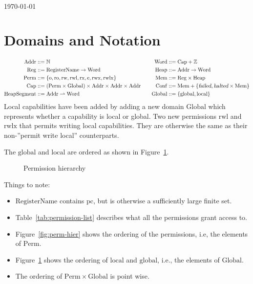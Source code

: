 \documentclass{article}
\newcommand{\parfun}{\rightharpoonup}
\newcommand{\pcreg}{\mathrm{pc}}
\newcommand{\failed}{\textsl{failed}}
\newcommand{\halted}{\textsl{halted}}
\newcommand{\plaindom}[1]{\mathrm{#1}}
\newcommand{\Caps}{\plaindom{Cap}}
\newcommand{\Words}{\plaindom{Word}}
\newcommand{\Addrs}{\plaindom{Addr}}
\newcommand{\Mems}{\plaindom{Mem}}
\newcommand{\RegName}{\plaindom{RegisterName}}
\newcommand{\Regs}{\plaindom{Reg}}
\newcommand{\Heaps}{\plaindom{Heap}}
\newcommand{\HeapSegments}{\plaindom{HeapSegment}}
\newcommand{\Confs}{\plaindom{Conf}}
\newcommand{\nats}{\mathbb{N}}
\newcommand{\ints}{\mathbb{Z}}
\newcommand{\Perms}{\plaindom{Perm}}
\newcommand{\Globals}{\plaindom{Global}}
\newcommand{\plainperm}[1]{\mathrm{#1}}
\newcommand{\noperm}{\plainperm{o}}
\newcommand{\readonly}{\plainperm{ro}}
\newcommand{\readwrite}{\plainperm{rw}}
\newcommand{\exec}{\plainperm{rx}}
\newcommand{\entry}{\plainperm{e}}
\newcommand{\rwx}{\plainperm{rwx}}
\newcommand{\readwritel}{\plainperm{rwl}}
\newcommand{\rwlx}{\plainperm{rwlx}}
\newcommand{\local}{\plainperm{local}}
\newcommand{\glob}{\plainperm{global}}
\begin{document}
\begin{flushright}
\today
\end{flushright}
\section{Domains and Notation}
\begin{align*}
\Addrs &::= \nats & & &
\Words &::= \Caps + \ints \\
\Regs  &::= \RegName \rightarrow \Words & & &
\Heaps &::= \Addrs \rightarrow \Words \\
\Perms &::= \{ \noperm, \readonly, \readwrite, \readwritel, \exec, \entry, \rwx, \rwlx\} & & &
\Mems  &::= \Regs \times \Heaps \\
\Caps  &::= (\Perms \times \Globals) \times \Addrs \times \Addrs \times \Addrs & & &
\Confs &::= \Mems + \{\failed, \halted \times \Mems\} \\
\HeapSegments &::= \Addrs \parfun \Words & & &
\Globals & ::= \{\glob, \local \}
\end{align*}
Local capabilities have been added by adding a new domain $\Globals$ which represents whether a capability is local or global. Two new permissions $\readwritel$ and $\rwlx$ that permits writing local capabilities. They are otherwise the same as their non-''permit write local'' counterparts.

The $\glob$ and $\local$ are ordered as shown in Figure~\ref{fig:glob-hier}.
\begin{figure}[!h]
  \centering
\caption{Permission hierarchy}
\label{fig:glob-hier}
\end{figure}

Things to note:
\begin{itemize}
\item $\RegName$ contains $\pcreg$, but is otherwise a sufficiently
  large finite set.
\item Table~\ref{tab:permission-list} describes what all the permissions grant access to.
\item Figure~\ref{fig:perm-hier} shows the ordering of the permissions, i.e, the elements of $\Perms$.
\item Figure~\ref{fig:glob-hier} shows the ordering of $\local$ and $\glob$, i.e., the elements of $\Globals$.
\item The ordering of $\Perms \times \Globals$ is point wise.
\end{itemize}
\end{document}
